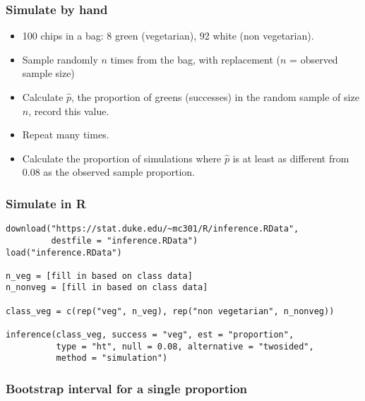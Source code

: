 \documentclass[11pt,containsverbatim,handout,xcolor=xelatex,dvipsnames,table]{beamer}
\begin{document}
\begin{frame}
\frametitle{Simulate by hand}


\pause

\begin{itemize}
\item 100 chips in a bag: 8 green (vegetarian), 92 white (non vegetarian).
\pause
\item Sample randomly $n$ times from the bag, with replacement ($n$ = observed sample size)
\pause
\item Calculate $\hat{p}$, the proportion of greens (successes) in the random sample of size $n$, record this value.
\pause
\item Repeat many times.
\pause
\item Calculate the proportion of simulations where $\hat{p}$ is at least as different from 0.08 as the observed sample proportion.
\end{itemize}

\end{frame}


\begin{frame}[fragile]
\frametitle{Simulate in R}

{\footnotesize
\begin{verbatim}
download("https://stat.duke.edu/~mc301/R/inference.RData", 
         destfile = "inference.RData")
load("inference.RData")

n_veg = [fill in based on class data]
n_nonveg = [fill in based on class data]

class_veg = c(rep("veg", n_veg), rep("non vegetarian", n_nonveg))

inference(class_veg, success = "veg", est = "proportion", 
          type = "ht", null = 0.08, alternative = "twosided", 
          method = "simulation")
\end{verbatim}
}

\end{frame}


\begin{frame}
\frametitle{Bootstrap interval for a single proportion}

\vfill


\vfill

\end{frame}
\end{document}
